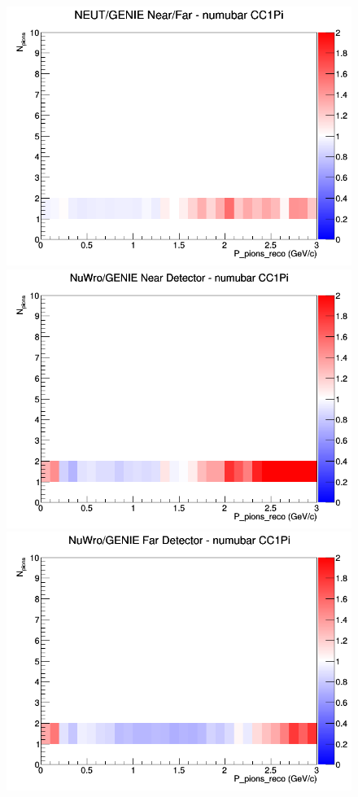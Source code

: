 \documentclass[12pt]{article}
\begin{document}
\begin{figure}[h]
\endminipage
{}
\includegraphics[width=\linewidth]{eff_N_P/GAr/pions/ratios/CC1Pi_NEUT_GENIE_numubar_NF_N_P.png}
\endminipage
\newline
{}
\includegraphics[width=\linewidth]{eff_N_P/GAr/pions/ratios/CC1Pi_NuWro_GENIE_numubar_near_N_P.png}
\endminipage
{}
\includegraphics[width=\linewidth]{eff_N_P/GAr/pions/ratios/CC1Pi_NuWro_GENIE_numubar_far_N_P.png}

\end{figure}
\end{document}
